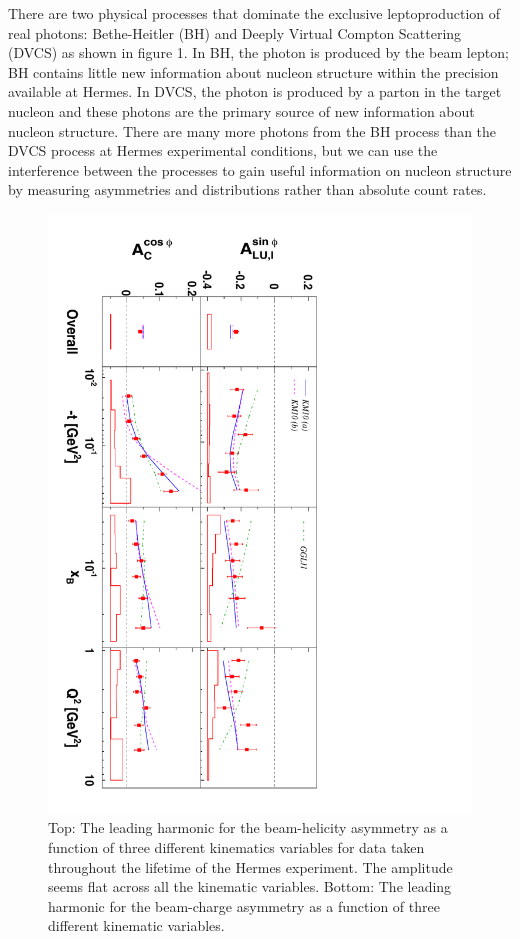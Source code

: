 \documentclass[11pt]{article}
\begin{document}
There are two physical processes that dominate the exclusive leptoproduction of real photons: Bethe-Heitler (BH) and Deeply Virtual Compton Scattering (DVCS) as shown in figure 1. In BH, the photon is produced by the beam lepton; BH contains little new information about nucleon structure within the precision available at H{\sc ermes}. In DVCS, the photon is produced by a parton in the target nucleon and these photons are the primary source of new information about nucleon structure. There are many more photons from the BH process than the DVCS process at H{\sc ermes} experimental conditions, but we can use the interference between the processes to gain useful information on nucleon structure by measuring asymmetries and distributions rather than absolute count rates.

\begin{figure}[ht]
\begin{center}
\includegraphics[angle=90,width=\textwidth]{dc90_data}
\caption{Top: The leading harmonic for the beam-helicity asymmetry as a function of three different kinematics variables for data taken throughout the lifetime of the H{\sc ermes} experiment. The amplitude seems flat across all the kinematic variables. Bottom: The leading harmonic for the beam-charge asymmetry as a function of three different kinematic variables. }
\end{center}
\end{figure}
\end{document}
